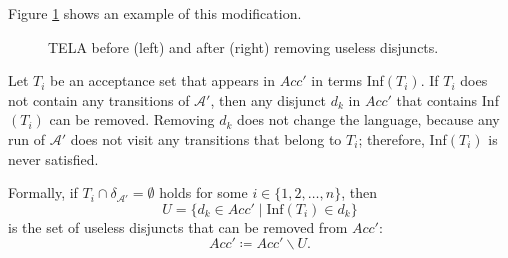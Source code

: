 \documentclass[
  digital, %
  twoside, %
  table,   %
  lof,     %
  lot,     %
]{fithesis3}
\begin{document}
Figure \ref{fig:rem_dis_fin} shows an example of this modification.

\begin{figure}[h]
  \centering
  \caption{TELA before (left) and after (right) removing useless disjuncts.}
  \label{fig:rem_dis_fin}
\end{figure}

Let $T_i$ be an acceptance set that appears in $Acc'$ in terms Inf$(T_i)$. If $T_i$ does not contain any transitions of $\mathcal{A'}$, then any disjunct $d_k$ in $Acc'$ that contains Inf$(T_i)$ can be removed. Removing $d_k$ does not change the language, because any run of $\mathcal{A'}$ does not visit any transitions that belong to $T_i$; therefore, Inf$(T_i)$ is never satisfied.

Formally, if $T_i \cap \delta_{\mathcal{A'}} = \emptyset$ holds for some $i \in \{1,2, \dots, n\}$, then 
\begin{equation*}
  U = \{d_k \in Acc' \mid \text{Inf}(T_i) \in d_k \}
\end{equation*}
is the set of useless disjuncts that can be removed from $Acc'$:
\begin{equation*}
  Acc' \coloneqq Acc' \smallsetminus U.
\end{equation*}
\end{document}

